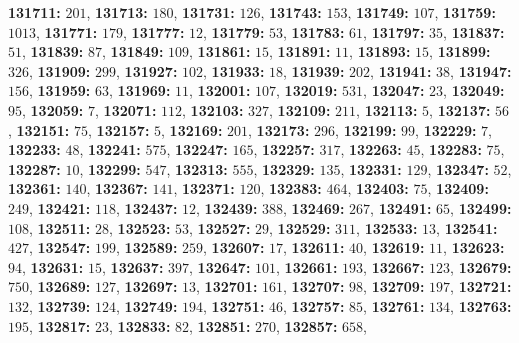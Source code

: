 \textsf{\bfseries 131711:} $201$, \textsf{\bfseries 131713:} $180$, \textsf{\bfseries 131731:} $126$, \textsf{\bfseries 131743:} $153$, \textsf{\bfseries 131749:} $107$, \textsf{\bfseries 131759:} $1013$, \textsf{\bfseries 131771:} $179$, \textsf{\bfseries 131777:} $12$, \textsf{\bfseries 131779:} $53$, \textsf{\bfseries 131783:} $61$, \textsf{\bfseries 131797:} $35$, \textsf{\bfseries 131837:} $51$, \textsf{\bfseries 131839:} $87$, \textsf{\bfseries 131849:} $109$, \textsf{\bfseries 131861:} $15$, \textsf{\bfseries 131891:} $11$, \textsf{\bfseries 131893:} $15$, \textsf{\bfseries 131899:} $326$, \textsf{\bfseries 131909:} $299$, \textsf{\bfseries 131927:} $102$, \textsf{\bfseries 131933:} $18$, \textsf{\bfseries 131939:} $202$, \textsf{\bfseries 131941:} $38$, \textsf{\bfseries 131947:} $156$, \textsf{\bfseries 131959:} $63$, \textsf{\bfseries 131969:} $11$, \textsf{\bfseries 132001:} $107$, \textsf{\bfseries 132019:} $531$, \textsf{\bfseries 132047:} $23$, \textsf{\bfseries 132049:} $95$, \textsf{\bfseries 132059:} $7$, \textsf{\bfseries 132071:} $112$, \textsf{\bfseries 132103:} $327$, \textsf{\bfseries 132109:} $211$, \textsf{\bfseries 132113:} $5$, \textsf{\bfseries 132137:} $56$, \textsf{\bfseries 132151:} $75$, \textsf{\bfseries 132157:} $5$, \textsf{\bfseries 132169:} $201$, \textsf{\bfseries 132173:} $296$, \textsf{\bfseries 132199:} $99$, \textsf{\bfseries 132229:} $7$, \textsf{\bfseries 132233:} $48$, \textsf{\bfseries 132241:} $575$, \textsf{\bfseries 132247:} $165$, \textsf{\bfseries 132257:} $317$, \textsf{\bfseries 132263:} $45$, \textsf{\bfseries 132283:} $75$, \textsf{\bfseries 132287:} $10$, \textsf{\bfseries 132299:} $547$, \textsf{\bfseries 132313:} $555$, \textsf{\bfseries 132329:} $135$, \textsf{\bfseries 132331:} $129$, \textsf{\bfseries 132347:} $52$, \textsf{\bfseries 132361:} $140$, \textsf{\bfseries 132367:} $141$, \textsf{\bfseries 132371:} $120$, \textsf{\bfseries 132383:} $464$, \textsf{\bfseries 132403:} $75$, \textsf{\bfseries 132409:} $249$, \textsf{\bfseries 132421:} $118$, \textsf{\bfseries 132437:} $12$, \textsf{\bfseries 132439:} $388$, \textsf{\bfseries 132469:} $267$, \textsf{\bfseries 132491:} $65$, \textsf{\bfseries 132499:} $108$, \textsf{\bfseries 132511:} $28$, \textsf{\bfseries 132523:} $53$, \textsf{\bfseries 132527:} $29$, \textsf{\bfseries 132529:} $311$, \textsf{\bfseries 132533:} $13$, \textsf{\bfseries 132541:} $427$, \textsf{\bfseries 132547:} $199$, \textsf{\bfseries 132589:} $259$, \textsf{\bfseries 132607:} $17$, \textsf{\bfseries 132611:} $40$, \textsf{\bfseries 132619:} $11$, \textsf{\bfseries 132623:} $94$, \textsf{\bfseries 132631:} $15$, \textsf{\bfseries 132637:} $397$, \textsf{\bfseries 132647:} $101$, \textsf{\bfseries 132661:} $193$, \textsf{\bfseries 132667:} $123$, \textsf{\bfseries 132679:} $750$, \textsf{\bfseries 132689:} $127$, \textsf{\bfseries 132697:} $13$, \textsf{\bfseries 132701:} $161$, \textsf{\bfseries 132707:} $98$, \textsf{\bfseries 132709:} $197$, \textsf{\bfseries 132721:} $132$, \textsf{\bfseries 132739:} $124$, \textsf{\bfseries 132749:} $194$, \textsf{\bfseries 132751:} $46$, \textsf{\bfseries 132757:} $85$, \textsf{\bfseries 132761:} $134$, \textsf{\bfseries 132763:} $195$, \textsf{\bfseries 132817:} $23$, \textsf{\bfseries 132833:} $82$, \textsf{\bfseries 132851:} $270$, \textsf{\bfseries 132857:} $658$, 

